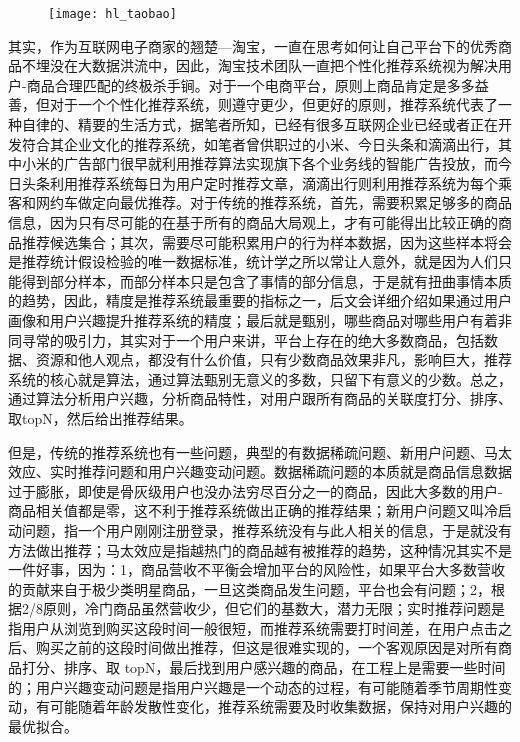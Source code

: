 	\begin{figure}
		\centering
		\texttt{[image: hl\_taobao]}
		\label{fig:hl_taobao}
	\end{figure}
	其实，作为互联网电子商家的翘楚---淘宝，一直在思考如何让自己平台下的优秀商品不埋没在大数据洪流中，因此，淘宝技术团队一直把个性化推荐系统视为解决用户-商品合理匹配的终极杀手锏。对于一个电商平台，原则上商品肯定是多多益善，但对于一个个性化推荐系统，则遵守更少，但更好的原则，推荐系统代表了一种自律的、精要的生活方式，据笔者所知，已经有很多互联网企业已经或者正在开发符合其企业文化的推荐系统，如笔者曾供职过的小米、今日头条和滴滴出行，其中小米的广告部门很早就利用推荐算法实现旗下各个业务线的智能广告投放，而今日头条利用推荐系统每日为用户定时推荐文章，滴滴出行则利用推荐系统为每个乘客和网约车做定向最优推荐。对于传统的推荐系统，首先，需要积累足够多的商品信息，因为只有尽可能的在基于所有的商品大局观上，才有可能得出比较正确的商品推荐候选集合；其次，需要尽可能积累用户的行为样本数据，因为这些样本将会是推荐统计假设检验的唯一数据标准，统计学之所以常让人意外，就是因为人们只能得到部分样本，而部分样本只是包含了事情的部分信息，于是就有扭曲事情本质的趋势，因此，精度是推荐系统最重要的指标之一，后文会详细介绍如果通过用户画像和用户兴趣\citep{user-interests-explore,user-interests-explore1,user-interests-explore2,user-interests-explore3,user-interests-explore4}提升推荐系统的精度；最后就是甄别，哪些商品对哪些用户有着非同寻常的吸引力，其实对于一个用户来讲，平台上存在的绝大多数商品，包括数据、资源和他人观点，都没有什么价值，只有少数商品效果非凡，影响巨大，推荐系统的核心就是算法\citep{date-mining}，通过算法甄别无意义的多数，只留下有意义的少数。总之，通过算法分析用户兴趣，分析商品特性，对用户跟所有商品的关联度打分、排序、取topN，然后给出推荐结果。

	但是，传统的推荐系统也有一些问题，典型的有数据稀疏问题、新用户问题、马太效应、实时推荐问题和用户兴趣变动问题。数据稀疏问题的本质就是商品信息数据过于膨胀，即使是骨灰级用户也没办法穷尽百分之一的商品，因此大多数的用户-商品相关值都是零，这不利于推荐系统做出正确的推荐结果；新用户问题又叫冷启动问题，指一个用户刚刚注册登录，推荐系统没有与此人相关的信息，于是就没有方法做出推荐；马太效应是指越热门的商品越有被推荐的趋势，这种情况其实不是一件好事，因为：1，商品营收不平衡会增加平台的风险性，如果平台大多数营收的贡献来自于极少类明星商品，一旦这类商品发生问题，平台也会有问题；2，根据2/8原则，冷门商品虽然营收少，但它们的基数大，潜力无限；实时推荐问题是指用户从浏览到购买这段时间一般很短，而推荐系统需要打时间差，在用户点击之后、购买之前的这段时间做出推荐，但这是很难实现的，一个客观原因是对所有商品打分、排序、取 topN，最后找到用户感兴趣的商品，在工程上是需要一些时间的；用户兴趣变动问题是指用户兴趣是一个动态的过程，有可能随着季节周期性变动，有可能随着年龄发散性变化，推荐系统需要及时收集数据，保持对用户兴趣的最优拟合。

